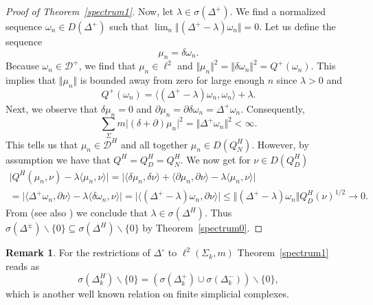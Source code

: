 \documentclass[10pt]{amsart}
\theoremstyle{definition}
\newtheorem*{remark}{Remark}
\renewcommand{\bullet}{{\circ}}
\begin{document}
\begin{proof}[Proof of Theorem~\ref{spectrum1}]
Now, let $\lambda\in\sigma(\Delta^+).$
    We find a normalized sequence $\omega_n\in D(\Delta^+)$ such that 
    $\lim_n\Vert(\Delta^+-\lambda)\omega_n\Vert = 0.$ Let us define the sequence $$\mu_n = \delta\omega_n.$$ Because $\omega_n\in\mathcal{D}^+$, we find that $\mu_n\in\ell^2$ and $\Vert\mu_n\Vert^2 = \Vert\delta\omega_n\Vert^2 = Q^+(\omega_n).$ This implies that $\Vert\mu_n\Vert$ is bounded away from zero for large enough $n$ since $\lambda>0$ and
    $$Q^+(\omega_n) = \langle (\Delta^+-\lambda)\omega_n,\omega_n\rangle+\lambda.$$
    Next, we observe that $\delta\mu_n = 0$ and $\partial\mu_n = \partial\delta\omega_n = \Delta^+\omega_n.$ Consequently,
    $$\sum_\Sigma m\vert (\delta+\partial)\mu_n\vert^2 = \Vert\Delta^+\omega_n\Vert^2<\infty.$$
    This tells us that $\mu_n\in \mathcal{D}^H$ and all together $\mu_n\in D(Q^H_N).$
    However, by assumption we have that $Q^{H}=Q^H_{D} = Q^H_N.$
    We now get for $\nu\in D(Q^H_{D})$
    \begin{multline*}
    \vert Q^H(\mu_n,\nu)-\lambda\langle\mu_n,\nu\rangle\vert  = \vert\langle\delta\mu_n,\delta\nu\rangle+\langle\partial\mu_n,\partial\nu\rangle-\lambda\langle\mu_n,\nu\rangle\vert\\  
    = \vert\langle\Delta^+\omega_n,\partial\nu\rangle-\lambda\langle\delta\omega_n,\nu\rangle\vert
     = \vert\langle(\Delta^+-\lambda)\omega_n,\partial\nu\rangle\vert
    \leq \Vert(\Delta^+-\lambda)\omega_n\Vert Q^H_D(\nu)^{1/2}\to 0.
    \end{multline*}
    From \cite[Lemma 1.4.4]{StollmannDisorder} (see also \cite[Theorem~E.3]{KLW}) we conclude that $\lambda\in\sigma(\Delta^H).$ Thus $\sigma(\Delta^\pm)\backslash\lbrace 0\rbrace\subseteq\sigma(\Delta^H)\backslash\lbrace 0\rbrace$  by Theorem~\ref{spectrum0}.
\end{proof}


\begin{remark}
    For the restrictions of $\Delta^\bullet$ to $\ell^2(\Sigma_k,m)$ %
    Theorem~\ref{spectrum1} reads as $$\sigma(\Delta^H_k)\backslash\lbrace 0\rbrace =(\sigma(\Delta^+_k)\cup\sigma(\Delta^-_{k}))\backslash\lbrace 0\rbrace,$$ which is another well known relation on finite simplicial complexes. 
\end{remark}
\end{document}
